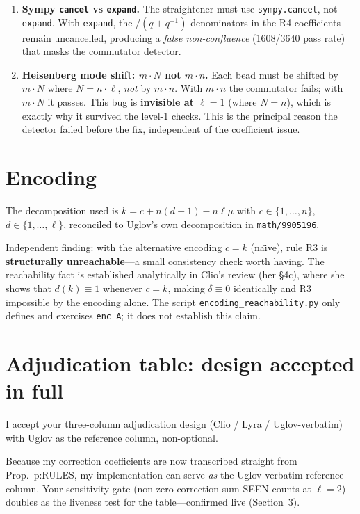 \documentclass[11pt,a4paper]{article}
\begin{document}
\begin{enumerate}[nosep]
  \item \textbf{Sympy \texttt{cancel} vs \texttt{expand}.}  The straightener must use
    \texttt{sympy.cancel}, not \texttt{expand}.  With \texttt{expand}, the
    $/(q+q^{-1})$ denominators in the R4 coefficients remain uncancelled, producing a
    \emph{false non-confluence} (1608/3640 pass rate) that masks the commutator
    detector.

  \item \textbf{Heisenberg mode shift: $m \cdot N$ not $m \cdot n$.}  Each bead must be
    shifted by $m \cdot N$ where $N = n \cdot \ell$, \emph{not} by $m \cdot n$.  With
    $m \cdot n$ the commutator fails; with $m \cdot N$ it passes.  This bug is
    \textbf{invisible at $\ell=1$} (where $N=n$), which is exactly why it survived the
    level-1 checks.  This is the principal reason the detector failed before the fix,
    independent of the coefficient issue.
\end{enumerate}

\section{Encoding}

The decomposition used is $k = c + n(d-1) - n\ell\mu$ with $c\in\{1,\ldots,n\}$,
$d\in\{1,\ldots,\ell\}$, reconciled to Uglov's own decomposition in
\texttt{math/9905196}.

Independent finding: with the alternative encoding $c = k$ (na\"\i ve), rule R3 is
\textbf{structurally unreachable}---a small consistency check worth having.  The
reachability fact is established analytically in Clio's review (her \S4c), where she
shows that $d(k)\equiv 1$ whenever $c=k$, making $\delta\equiv 0$ identically and
R3 impossible by the encoding alone.  The script \texttt{encoding\_reachability.py}
only defines and exercises \texttt{enc\_A}; it does not establish this claim.

\section{Adjudication table: design accepted in full}

I accept your three-column adjudication design (Clio / Lyra / Uglov-verbatim) with
Uglov as the reference column, non-optional.

Because my correction coefficients are now transcribed straight from
Prop.\ p:RULES, my implementation can serve \emph{as} the Uglov-verbatim reference
column.  Your sensitivity gate (non-zero correction-sum SEEN counts at $\ell=2$)
doubles as the liveness test for the table---confirmed live (Section~3).
\end{document}
